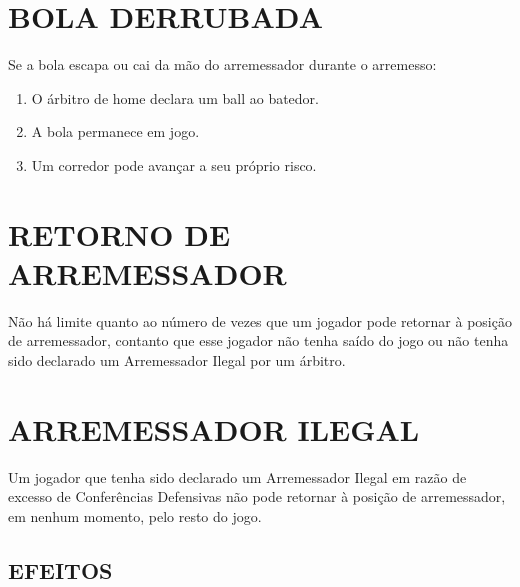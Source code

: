 \section{BOLA DERRUBADA} 
\begin{multicols}{2}
	Se a bola escapa ou cai da m\~ao do arremessador durante o arremesso: 
	
	\begin{enumerate}[label=\alph*)]
		\item O \'arbitro de \gls{home} declara um \gls{ball} ao batedor. 
		
		\item  A bola permanece em jogo. 
		
		\item  Um corredor pode avan\c{c}ar a seu pr\'oprio risco. 
	\end{enumerate}
	
\end{multicols}

\section{RETORNO DE ARREMESSADOR}
\begin{multicols}{2}
	N\~ao h\'a limite quanto ao n\'umero de vezes que um jogador pode retornar \`a posi\c{c}\~ao de arremessador, contanto que esse jogador n\~ao tenha sa\'ido do jogo ou n\~ao tenha sido declarado um Arremessador Ilegal por um \'arbitro. 
	
	
\end{multicols}

\section{ARREMESSADOR ILEGAL}
\begin{multicols}{2}
	Um jogador que tenha sido declarado um Arremessador Ilegal em raz\~ao de excesso de Confer\^encias Defensivas n\~ao pode retornar \`a posi\c{c}\~ao de arremessador, em nenhum momento, pelo resto do jogo. 
	
\end{multicols}

\subsection*{EFEITOS}

